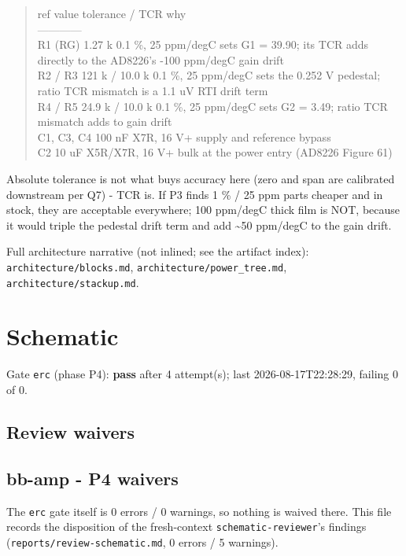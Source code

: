 \documentclass[11pt,a4paper]{article}
\begin{document}
\begin{quote}\small\ttfamily\raggedright
\textbar{} ref \textbar{} value \textbar{} tolerance / TCR \textbar{} why \textbar{}\\
\textbar{}---\textbar{}---\textbar{}---\textbar{}---\textbar{}\\
\textbar{} R1 (RG) \textbar{} 1.27 k \textbar{} 0.1 \%, 25 ppm/degC \textbar{} sets G1 = 39.90; its TCR adds directly to the AD8226's -100 ppm/degC gain drift \textbar{}\\
\textbar{} R2 / R3 \textbar{} 121 k / 10.0 k \textbar{} 0.1 \%, 25 ppm/degC \textbar{} sets the 0.252 V pedestal; ratio TCR mismatch is a 1.1 uV RTI drift term \textbar{}\\
\textbar{} R4 / R5 \textbar{} 24.9 k / 10.0 k \textbar{} 0.1 \%, 25 ppm/degC \textbar{} sets G2 = 3.49; ratio TCR mismatch adds to gain drift \textbar{}\\
\textbar{} C1, C3, C4 \textbar{} 100 nF \textbar{} X7R, 16 V+ \textbar{} supply and reference bypass \textbar{}\\
\textbar{} C2 \textbar{} 10 uF \textbar{} X5R/X7R, 16 V+ \textbar{} bulk at the power entry (AD8226 Figure 61) \textbar{}
\end{quote}
Absolute tolerance is not what buys accuracy here (zero and span are calibrated downstream per Q7) - TCR is. If P3 finds 1 \% / 25 ppm parts cheaper and in stock, they are acceptable everywhere; 100 ppm/degC thick film is NOT, because it would triple the pedestal drift term and add \textasciitilde{}50 ppm/degC to the gain drift.

Full architecture narrative (not inlined; see the artifact index): \texttt{architecture/blocks.md}, \texttt{architecture/power\_tree.md}, \texttt{architecture/stackup.md}.
\section{Schematic}
Gate \texttt{erc} (phase P4): \textbf{pass} after 4 attempt(s); last 2026-08-17T22:28:29, failing 0 of 0.
\subsection*{Review waivers}
\subsection*{bb-amp - P4 waivers}
The \texttt{erc} gate itself is 0 errors / 0 warnings, so nothing is waived there. This file records the disposition of the fresh-context \texttt{schematic-reviewer}'s findings (\texttt{reports/review-schematic.md}, 0 errors / 5 warnings).
\end{document}
